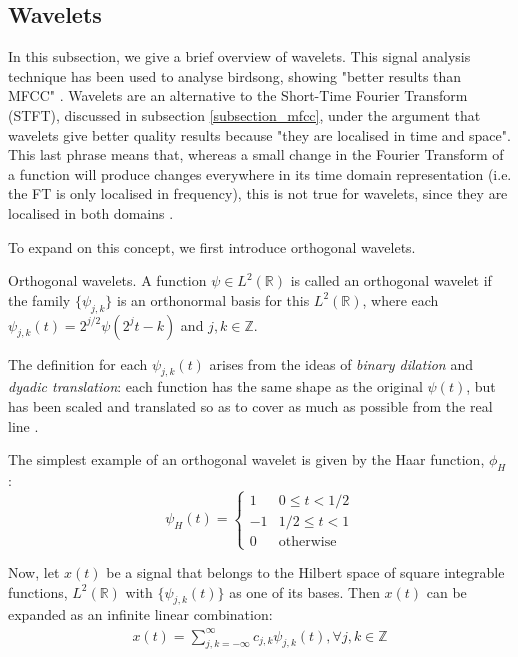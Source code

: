 \documentclass[../main.tex]{subfiles}
\begin{document}
\subsection{Wavelets} \label{subsection_wavelets}
In this subsection, we give a brief overview of wavelets. This signal analysis technique has been used to analyse birdsong, showing "better results than MFCC" \cite{Chou2009}. Wavelets are an alternative to the Short-Time Fourier Transform (STFT), discussed in subsection \ref{subsection_mfcc}, under the argument that wavelets give better quality results because "they are localised in time and space". This last phrase means that, whereas a small change in the Fourier Transform of a function will produce changes everywhere in its time domain representation (i.e. the FT is only localised in frequency), this is not true for wavelets, since they are localised in both domains \cite{Vidakovic1991}.
\par To expand on this concept, we first introduce orthogonal wavelets.
\begin{definition}{Orthogonal wavelets.} \label{def_onwavelets}
A function $\psi\in L^2(\mathbb{R})$ is called an orthogonal wavelet if the family $\{\psi_{j,k}\}$ is an orthonormal basis for this $L^2(\mathbb{R})$, where each $\psi_{j,k}(t) = 2^{j/2}\psi(2^jt-k)$ and $j, k \in \mathbb{Z}$.
\end{definition}
\par The definition for each $\psi_{j,k}(t)$ arises from the ideas of \emph{binary dilation} and \emph{dyadic translation}: each function has the same shape as the original $\psi(t)$, but has been scaled and translated so as to cover as much as possible from the real line \cite{Chui1992}. 
\par The simplest example of an orthogonal wavelet is given by the Haar function, $\phi_H$ \cite{Chui1992}:
\begin{displaymath}
   \psi_H(t) = \left\{
     \begin{array}{lr}
      1 & 0 \leq t < 1/2 \\
      -1 & 1/2 \leq t < 1 \\
      0 & \text{otherwise} 
     \end{array}
   \right.
\end{displaymath}
\par Now, let $x(t)$ be a signal that belongs to the Hilbert space of square integrable functions, $L^2(\mathbb{R})$ with $\{\psi_{j,k}(t)\}$ as one of its bases. Then $x(t)$ can be expanded as an infinite linear combination:
\begin{align*}
x(t) = \sum_{j,k=-\infty}^{\infty}{c_{j,k}\psi_{j,k}(t)}, \forall j,k \in \mathbb{Z}
\end{align*}
\end{document}
